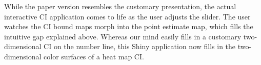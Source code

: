 While the paper version resembles the customary presentation, the actual interactive CI application comes to life as the user adjusts the slider. The user watches the CI bound maps morph into the point estimate map, which fills the intuitive gap explained above. Whereas our mind easily fills in a customary two-dimensional CI on the number line, this Shiny application now fills in the two-dimensional color surfaces of a heat map CI.

% 
